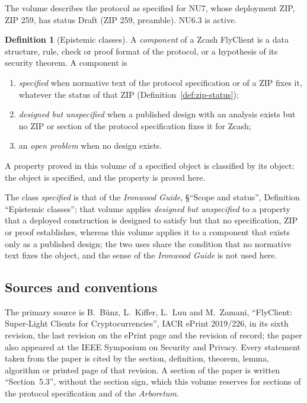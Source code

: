 \documentclass[11pt,a4paper]{article}
\theoremstyle{definition}
\newtheorem{definition}[theorem]{Definition}
\begin{document}
The volume describes the protocol as specified for NU7, whose deployment ZIP,
ZIP 259, has status Draft (ZIP 259, preamble). NU6.3 is active.

\begin{definition}[Epistemic classes]\label{def:classes}
A \emph{component} of a Zcash FlyClient is a data structure, rule, check or
proof format of the protocol, or a hypothesis of its security theorem. A
component is
\begin{enumerate}[label=(\roman*)]
\item \emph{specified} when normative text of the protocol specification or
  of a ZIP fixes it, whatever the status of that ZIP
  (Definition~\ref{def:zip-status});
\item \emph{designed but unspecified} when a published design with an
  analysis exists but no ZIP or section of the protocol specification fixes
  it for Zcash;
\item an \emph{open problem} when no design exists.
\end{enumerate}
A property proved in this volume of a specified object is classified by its
object: the object is specified, and the property is proved here.
\end{definition}

The class \emph{specified} is that of the \emph{Ironwood Guide}, \S``Scope and
status'', Definition ``Epistemic classes''; that volume applies
\emph{designed but unspecified} to a property that a deployed construction is
designed to satisfy but that no specification, ZIP or proof establishes,
whereas this volume applies it to a component that exists only as a published
design; the two uses share the condition that no normative text fixes the
object, and the sense of the \emph{Ironwood Guide} is not used here.

\subsection{Sources and conventions}\label{sec:intro-sources}

The primary source is B.~B\"unz, L.~Kiffer, L.~Luu and M.~Zamani,
``FlyClient: Super-Light Clients for Cryptocurrencies'', IACR ePrint
2019/226, in its sixth revision, the last revision on the ePrint page and the
revision of record; the paper also appeared at the IEEE Symposium on Security
and Privacy. Every statement taken from the paper is cited by the section,
definition, theorem, lemma, algorithm or printed page of that revision. A
section of the paper is written ``Section~5.3'', without the section sign,
which this volume reserves for sections of the protocol specification and of
the \emph{Arboretum}.
\end{document}
